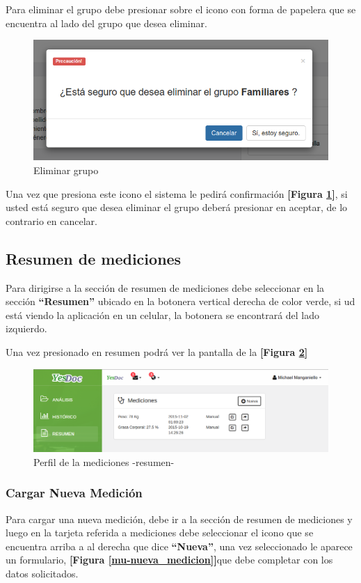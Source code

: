 Para eliminar el grupo debe presionar sobre el icono con forma de papelera que se encuentra al lado del grupo que desea eliminar.
    \begin{figure}
    	\centering
    	\includegraphics[width=.8\textwidth]{img/manual_de_usuario/eliminar_grupo}
    	\caption{Eliminar grupo}
    	\label{mu-eliminar_grupo}
    \end{figure}
    
 Una vez que presiona este icono el sistema le pedirá confirmación \textbf{[Figura \ref{mu-eliminar_grupo}]}, si usted está seguro que desea eliminar el grupo deberá presionar en aceptar, de lo contrario en cancelar.    
    
   
    
\subsection{Resumen de mediciones}    
Para dirigirse a la sección de resumen de mediciones debe seleccionar en la sección \textbf{``Resumen''} ubicado en la botonera vertical derecha de color verde, si ud está viendo la aplicación en un celular, la botonera se encontrará del lado izquierdo.

Una vez presionado en resumen podrá ver la pantalla de la \textbf{[Figura \ref{mu-resumen_medicion}]}
 

    \begin{figure}
    	\centering
    	\includegraphics[width=.8\textwidth]{img/manual_de_usuario/resumen_medicion}
    	\caption{Perfil de la mediciones -resumen-}
    	\label{mu-resumen_medicion}
    \end{figure}

\clearpage
\subsubsection{Cargar Nueva Medición}
Para cargar una nueva medición, debe ir a la sección de resumen de mediciones y luego en la tarjeta referida a mediciones debe seleccionar el icono que se encuentra arriba a al derecha que dice \textbf{``Nueva''}, una vez seleccionado le aparece un formulario, \textbf{[Figura \ref{mu-nueva_medicion}]}que debe completar con los datos solicitados.

